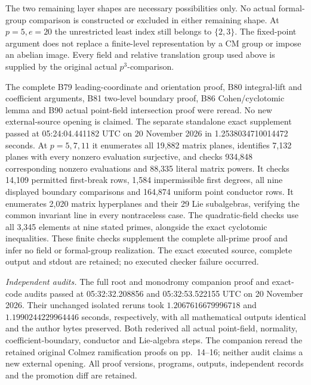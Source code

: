 \begin{remark}
\label{rem:B-RD97-scope}
The two remaining layer shapes are necessary possibilities only.
No actual formal-group comparison is constructed or excluded in
either remaining shape. At $p=5,e=20$ the unrestricted least index
still belongs to $\{2,3\}$. The fixed-point argument does not
replace a finite-level representation by a CM group or impose an
abelian image. Every field and relative translation group used
above is supplied by the original actual $p^3$-comparison.

The complete B79 leading-coordinate and orientation proof, B80
integral-lift and coefficient arguments, B81 two-level boundary
proof, B86 Cohen/cyclotomic lemma and B90 actual point-field
intersection proof were reread. No new external-source opening
is claimed. The separate standalone exact supplement
passed at 05:24:04.441182 UTC on 20 November 2026 in
1.2538034710014472 seconds. At $p=5,7,11$ it enumerates all
19,882 matrix planes, identifies 7,132 planes with every nonzero
evaluation surjective, and checks 934,848 corresponding nonzero
evaluations and 88,335 literal matrix powers. It checks 14,109
permitted first-break rows, 1,584 impermissible first degrees, all
nine displayed boundary comparisons and 164,874 uniform point
conductor rows. It enumerates 2,020 matrix hyperplanes and their
29 Lie subalgebras, verifying the common invariant line in every
nontraceless case. The quadratic-field checks use all 3,345
elements at nine stated primes, alongside the exact cyclotomic
inequalities. These finite checks supplement the complete all-prime
proof and infer no field or formal-group realization. The exact
executed source, complete output and stdout are retained; no
executed checker failure occurred.

\smallskip
\noindent\emph{Independent audits.}
The full root and monodromy companion proof and exact-code audits
passed at 05:32:32.208856 and 05:32:53.522155 UTC on
20 November 2026. Their unchanged isolated reruns took
\(1.2067616679996718\) and \(1.1990244229964446\) seconds,
respectively, with all mathematical outputs identical and the
author bytes preserved. Both rederived all actual point-field,
normality, coefficient-boundary, conductor and Lie-algebra steps.
The companion reread the retained original Colmez ramification
proofs on pp.~14--16; neither audit claims a new external opening.
All proof versions, programs, outputs, independent records and
the promotion diff are retained.
\end{remark}
